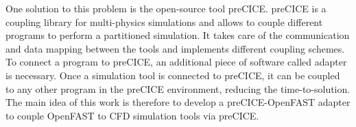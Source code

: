 One solution to this problem is the open-source tool preCICE. preCICE is a coupling library for multi-physics simulations and allows to couple different programs to perform a partitioned simulation. It takes care of the communication and data mapping between the tools and implements different coupling schemes. To connect a program to preCICE, an additional piece of software called adapter is necessary. Once a simulation tool is connected to preCICE, it can be coupled to any other program in the preCICE environment, reducing the time-to-solution. The main idea of this work is therefore to develop a preCICE-OpenFAST adapter to couple OpenFAST to CFD simulation tools via preCICE.

